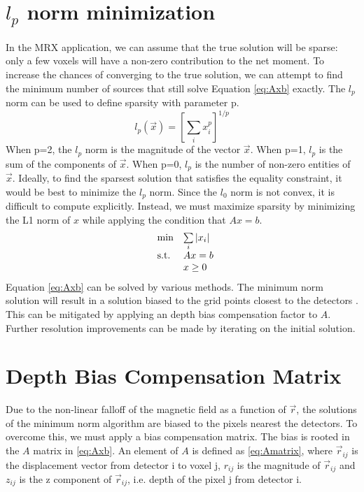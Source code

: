 \documentclass[a4paper]{article}
\begin{document}
\section{$l_{p}$ norm minimization}
In the MRX application, we can assume that the true solution will be sparse:  only a few voxels will have a non-zero contribution to the net moment.  To increase the chances of converging to the true solution, we can attempt to find the minimum number of sources that still solve Equation \ref{eq:Axb} exactly.  The $l_p$ norm can be used to define sparsity with parameter p.
 \begin{equation}
 l_{p}(\vec{x})=\left[\sum_{i}x_{i}^{p}\right]^{1/p} 
 \end{equation}
When p=2, the $l_{p}$ norm is the magnitude of the vector $\vec{x}$.  When p=1, $l_{p}$ is the sum of the components of $\vec{x}$.  When p=0, $l_{p}$ is the number of non-zero entities of $\vec{x}$.  Ideally, to find the sparsest solution that satisfies the equality constraint, it would be best to minimize the $l_{p}$ norm.  Since the $l_0$ norm is not convex, it is difficult to compute explicitly. Instead, we must maximize sparsity by minimizing the L1 norm of $x$ while applying the condition that $Ax = b$.
\begin{equation}\label{eq:linprog}
\centering
  \begin{array}{ll@{}r@{}r@{}l}
    \text{min} & \sum\limits_{i} |x_i| \\[\jot]
    \text{s.t.}& Ax = b \\
    & \multicolumn{4}{l}{x \geq 0}
  \end{array}
\end{equation}
Equation \ref{eq:Axb} can be solved by various methods.  The minimum norm solution will result in a solution biased to the grid points closest to the detectors \cite{Gorodnitsky}.  This can be mitigated by applying an depth bias compensation factor to $A$.  Further resolution improvements can be made by iterating on the initial solution.

\section{Depth Bias Compensation Matrix}
Due to the non-linear falloff of the magnetic field as  a function of $\vec{r}$, the solutions of the minimum norm algorithm are biased to the pixels nearest the detectors.  To overcome this, we must apply a bias compensation matrix.  The bias is rooted in the $A$ matrix in \ref{eq:Axb}.  An element of $A$ is defined as \ref{eq:Amatrix}, where $\vec{r}_{ij}$ is the displacement vector from detector i to voxel j, $r_{ij}$ is the magnitude of $\vec{r}_{ij}$ and $z_{ij}$ is the z component of $\vec{r}_{ij}$, i.e. depth of the pixel j from detector i.
\end{document}
